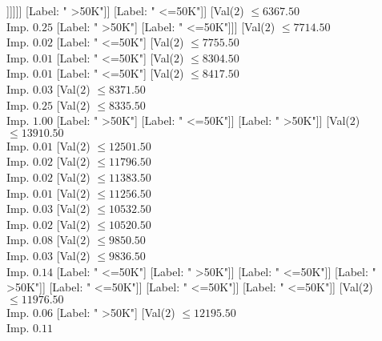 \documentclass[margin=10pt]{standalone}
\begin{document}
\begin{forest}
																			[Label: " <=50K"]
																			[Val($2$) $ \leq 5736.50$ \\ Imp. $0.54$
																				[Label: " >50K"]
																				[Label: " <=50K"]]]]]]
															[Label: " >50K"]]
														[Label: " <=50K"]]
													[Val($2$) $ \leq 6367.50$ \\ Imp. $0.25$
														[Label: " >50K"]
														[Label: " <=50K"]]]
												[Val($2$) $ \leq 7714.50$ \\ Imp. $0.02$
													[Label: " <=50K"]
													[Val($2$) $ \leq 7755.50$ \\ Imp. $0.01$
														[Label: " <=50K"]
														[Val($2$) $ \leq 8304.50$ \\ Imp. $0.01$
															[Label: " <=50K"]
															[Val($2$) $ \leq 8417.50$ \\ Imp. $0.03$
																[Val($2$) $ \leq 8371.50$ \\ Imp. $0.25$
																	[Val($2$) $ \leq 8335.50$ \\ Imp. $1.00$
																		[Label: " >50K"]
																		[Label: " <=50K"]]
																	[Label: " >50K"]]
																[Val($2$) $ \leq 13910.50$ \\ Imp. $0.01$
																	[Val($2$) $ \leq 12501.50$ \\ Imp. $0.02$
																		[Val($2$) $ \leq 11796.50$ \\ Imp. $0.02$
																			[Val($2$) $ \leq 11383.50$ \\ Imp. $0.01$
																				[Val($2$) $ \leq 11256.50$ \\ Imp. $0.03$
																					[Val($2$) $ \leq 10532.50$ \\ Imp. $0.02$
																						[Val($2$) $ \leq 10520.50$ \\ Imp. $0.08$
																							[Val($2$) $ \leq 9850.50$ \\ Imp. $0.03$
																								[Val($2$) $ \leq 9836.50$ \\ Imp. $0.14$
																									[Label: " <=50K"]
																									[Label: " >50K"]]
																								[Label: " <=50K"]]
																							[Label: " >50K"]]
																						[Label: " <=50K"]]
																					[Label: " <=50K"]]
																				[Label: " <=50K"]]
																			[Val($2$) $ \leq 11976.50$ \\ Imp. $0.06$
																				[Label: " >50K"]
																				[Val($2$) $ \leq 12195.50$ \\ Imp. $0.11$

\end{forest}
\end{document}
